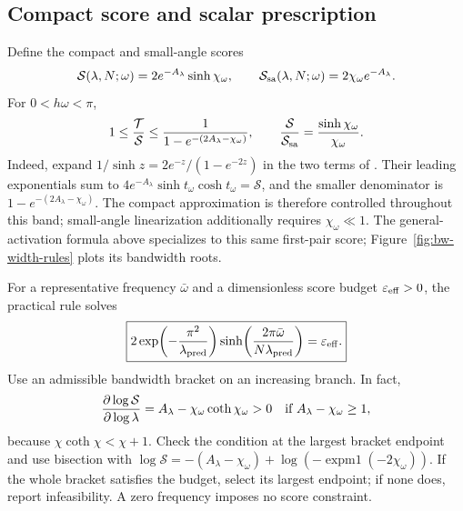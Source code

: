 \documentclass[11pt]{article}
\begin{document}
\subsection{Compact score and scalar prescription}
Define the compact and small-angle scores
\begin{equation}
 \mathcal S(\lambda,N;\omega)=2e^{-A_\lambda}\sinh\chi_\omega,
 \qquad
 \mathcal S_{\rm sa}(\lambda,N;\omega)=2\chi_\omega e^{-A_\lambda}.
 \label{eq:bandwidth-scores}
\end{equation}
For $0<h\omega<\pi$,
\begin{equation}
 1\le\frac{\mathcal T}{\mathcal S}
 \le\frac1{1-e^{-(2A_\lambda-\chi_\omega)}},
 \qquad
 \frac{\mathcal S}{\mathcal S_{\rm sa}}
 =\frac{\sinh\chi_\omega}{\chi_\omega}.
 \label{eq:bandwidth-score-comparison}
\end{equation}
Indeed, expand $1/\sinh z=2e^{-z}/(1-e^{-2z})$ in the two terms of
. Their leading exponentials sum to
$4e^{-A_\lambda}\sinh t_\omega\cosh t_\omega=\mathcal S$, and the
smaller denominator is $1-e^{-(2A_\lambda-\chi_\omega)}$.
The compact approximation is therefore controlled throughout this band;
small-angle linearization additionally requires $\chi_\omega\ll1$.
The general-activation formula above specializes to this same first-pair
score; Figure~\ref{fig:bw-width-rules} plots its bandwidth roots.

For a representative frequency $\bar\omega$ and a dimensionless score budget
$\varepsilon_{\rm eff}>0$, the practical rule solves
\begin{equation}
 \boxed{2\exp\!\left(-\frac{\pi^2}{\lambda_{\rm pred}}\right)
 \sinh\!\left(\frac{2\pi\bar\omega}{N\lambda_{\rm pred}}\right)
 =\varepsilon_{\rm eff}.}
 \label{eq:bandwidth-prescription}
\end{equation}
Use an admissible bandwidth bracket on an increasing branch. In fact,
\begin{equation}
 \frac{\partial\log\mathcal S}{\partial\log\lambda}
 =A_\lambda-\chi_\omega\coth\chi_\omega>0
 \quad\hbox{if }A_\lambda-\chi_\omega\ge1,
 \label{eq:bandwidth-monotonicity}
\end{equation}
because $\chi\coth\chi<\chi+1$. Check the condition at the largest bracket endpoint and use bisection with
$\log\mathcal S=-(A_\lambda-\chi_\omega)
 +\log(-\operatorname{expm1}(-2\chi_\omega))$.
If the whole bracket satisfies the budget, select its largest endpoint;
if none does, report infeasibility. A zero frequency imposes no score constraint.
\end{document}
